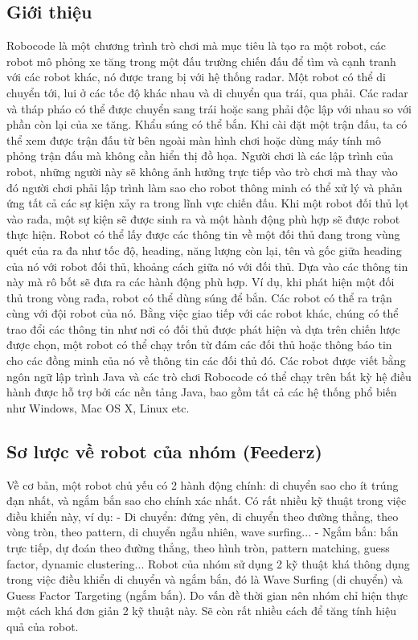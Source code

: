 \documentclass[14pt]{article}
\begin{document}
\subsection{Giới thiệu}
Robocode là một chương trình trò chơi mà mục tiêu là tạo ra một robot, các robot mô phỏng xe tăng trong một đấu trường chiến đấu để tìm và cạnh tranh với các robot khác, nó được trang bị với hệ thống radar. Một robot có thể di chuyển tới, lui ở các tốc độ khác nhau và di chuyển qua trái, qua phải. Các radar và tháp pháo có thể được chuyển sang trái hoặc sang phải độc lập với nhau so với phần còn lại của xe tăng. Khẩu súng có thể bắn. Khi cài đặt một trận đấu, ta có thể xem được trận đấu từ bên ngoài màn hình chơi hoặc dùng máy tính mô phỏng trận đấu mà không cần hiển thị đồ họa. Người chơi là các lập trình của robot, những người này sẽ không ảnh hưởng trực tiếp vào trò chơi mà thay vào đó người chơi phải lập trình làm sao cho robot thông minh có thể xử lý và phản ứng tất cả các sự kiện xảy ra trong lĩnh vực chiến đấu. Khi một robot đối thủ lọt vào rađa, một sự kiện sẽ được sinh ra và một hành động phù hợp sẽ được robot thực hiện. Robot có thể lấy được các thông tin về một đối thủ đang trong vùng quét của ra đa như tốc độ, heading, năng lượng còn lại, tên và gốc giữa heading của nó với robot đối thủ, khoảng cách giữa nó với đối thủ. Dựa vào các thông tin này mà rô bốt sẽ đưa ra các hành động phù hợp. Ví dụ, khi phát hiện một đối thủ trong vòng rađa, robot có thể dùng súng để bắn. Các robot có thể ra trận cùng với đội robot của nó. Bằng việc giao tiếp với các robot khác, chúng có thể trao đổi các thông tin như nơi có đối thủ được phát hiện và dựa trên chiến lược được chọn, một robot có thể chạy trốn từ đám các đối thủ hoặc thông báo tin cho các đồng minh của nó về thông tin các đối thủ đó. Các robot được viết bằng ngôn ngữ lập trình Java và các trò chơi Robocode có thể chạy trên bất kỳ hệ điều hành được hỗ trợ bởi các nền tảng Java, bao gồm tất cả các hệ thống phổ biến như Windows, Mac OS X, Linux etc.
\subsection{Sơ lược về robot của nhóm (Feederz)}
Về cơ bản, một robot chủ yếu có 2 hành động chính: di chuyển sao cho ít trúng đạn nhất, và ngắm bắn sao cho chính xác nhất. Có rất nhiều kỹ thuật trong việc điều khiển này, ví dụ:
- Di chuyển: đứng yên, di chuyển theo đường thẳng, theo vòng tròn, theo pattern, di chuyển ngẫu nhiên, wave surfing...
- Ngắm bắn: bắn trực tiếp, dự đoán theo đường thẳng, theo hình tròn, pattern matching, guess factor, dynamic clustering...
Robot của nhóm sử dụng 2 kỹ thuật khá thông dụng trong việc điều khiển di chuyển và ngắm bắn, đó là Wave Surfing (di chuyển) và Guess Factor Targeting (ngắm bắn).
Do vấn đề thời gian nên nhóm chỉ hiện thực một cách khá đơn giản 2 kỹ thuật này. Sẽ còn rất nhiều cách để tăng tính hiệu quả của robot.
\end{document}
